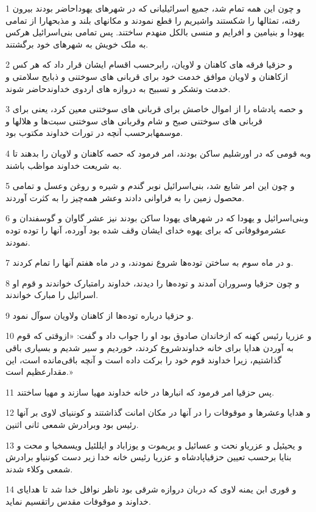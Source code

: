 \par 1 و چون این همه تمام شد، جمیع اسرائیلیانی که در شهرهای یهوداحاضر بودند بیرون رفته، تمثالها را شکستند واشیریم را قطع نمودند و مکانهای بلند و مذبحهارا از تمامی یهودا و بنیامین و افرایم و منسی بالکل منهدم ساختند. پس تمامی بنی‌اسرائیل هرکس به ملک خویش به شهرهای خود برگشتند.
\par 2 و حزقیا فرقه های کاهنان و لاویان، رابرحسب اقسام ایشان قرار داد که هر کس ازکاهنان و لاویان موافق خدمت خود برای قربانی های سوختنی و ذبایح سلامتی و خدمت وتشکر و تسبیح به دروازه های اردوی خداوندحاضر شوند.
\par 3 و حصه پادشاه را از اموال خاصش برای قربانی های سوختنی معین کرد، یعنی برای قربانی های سوختنی صبح و شام وقربانی های سوختنی سبت‌ها و هلالها و موسمهابرحسب آنچه در تورات خداوند مکتوب بود.
\par 4 وبه قومی که در اورشلیم ساکن بودند، امر فرمود که حصه کاهنان و لاویان را بدهند تا به شریعت خداوند مواظب باشند.
\par 5 و چون این امر شایع شد، بنی‌اسرائیل نوبر گندم و شیره و روغن وعسل و تمامی محصول زمین را به فراوانی دادند وعشر همه‌چیز را به کثرت آوردند.
\par 6 وبنی‌اسرائیل و یهودا که در شهرهای یهودا ساکن بودند نیز عشر گاوان و گوسفندان و عشرموقوفاتی که برای یهوه خدای ایشان وقف شده بود آورده، آنها را توده توده نمودند.
\par 7 و در ماه سوم به ساختن توده‌ها شروع نمودند، و در ماه هفتم آنها را تمام کردند.
\par 8 و چون حزقیا وسروران آمدند و توده‌ها را دیدند، خداوند رامتبارک خواندند و قوم او اسرائیل را مبارک خواندند.
\par 9 و حزقیا درباره توده‌ها از کاهنان ولاویان سوآل نمود.
\par 10 و عزریا رئیس کهنه که ازخاندان صادوق بود او را جواب داد و گفت: «ازوقتی که قوم به آوردن هدایا برای خانه خداوندشروع کردند، خوردیم و سیر شدیم و بسیاری باقی گذاشتیم، زیرا خداوند قوم خود را برکت داده است و آنچه باقی‌مانده است، این مقدارعظیم است.»
\par 11 پس حزقیا امر فرمود که انبارها در خانه خداوند مهیا سازند و مهیا ساختند.
\par 12 و هدایا وعشرها و موقوفات را در آنها در مکان امانت گذاشتند و کوننیای لاوی بر آنها رئیس بود وبرادرش شمعی ثانی اثنین.
\par 13 و یحیئیل و عزریاو نحت و عسائیل و یریموت و یوزاباد و ایللئیل ویسمخیا و محت و بنایا برحسب تعیین حزقیاپادشاه و عزریا رئیس خانه خدا زیر دست کوننیاو برادرش شمعی وکلاء شدند.
\par 14 و قوری ابن یمنه لاوی که دربان دروازه شرقی بود ناظر نوافل خدا شد تا هدایای خداوند و موقوفات مقدس راتقسیم نماید.
